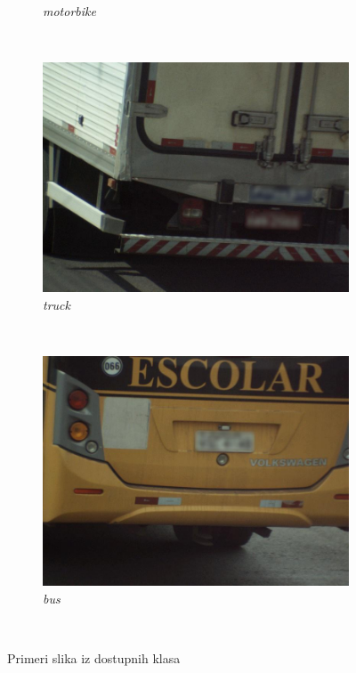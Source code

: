 \documentclass[12pt,oneside]{memoir}
\begin{document}
\begin{figure}
\begin{subfigure}[b]{0.48\textwidth}
        \caption{\textit{motorbike}}
        \label{fig:section3_motorbike}
    \end{subfigure}
    ~
    \begin{subfigure}[b]{0.48\textwidth}
        \includegraphics[width=\textwidth]{matfmaster/glava3/truck.jpg}
        \caption{\textit{truck}}
        \label{fig:section3_truck}
    \end{subfigure}
    ~
    \begin{subfigure}[b]{0.48\textwidth}
        \includegraphics[width=\textwidth]{matfmaster/glava3/bus.jpg}
        \caption{\textit{bus}}
        \label{fig:section3_bus}
    \end{subfigure}
    ~
    \caption{Primeri slika iz dostupnih klasa}\label{fig:section3_allclasses}
\end{figure}
\end{document}
